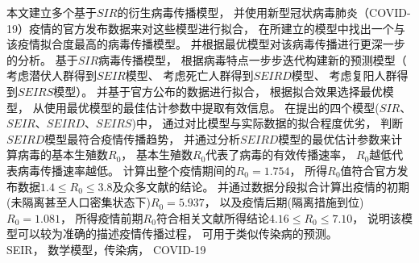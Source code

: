 \begin{cnabstract}
	\songti {}
	本文建立多个基于$SIR$的衍生病毒传播模型，
	并使用新型冠状病毒肺炎（COVID-19）疫情的官方发布数据来对这些模型进行拟合，
	在所建立的模型中找出一个与该疫情拟合度最高的病毒传播模型。
	并根据最优模型对该病毒传播进行更深一步的分析。
	基于$SIR$病毒传播模型，
	根据病毒特点一步步迭代构建新的预测模型（
	考虑潜伏人群得到$SEIR$模型、
	考虑死亡人群得到$SEIRD$模型、
	考虑复阳人群得到$SEIRS$模型）。
	并基于官方公布的数据进行拟合，
	根据拟合效果选择最优模型，
	从使用最优模型的最佳估计参数中提取有效信息。
	在提出的四个模型($SIR$、$SEIR$、$SEIRD$、$SEIRS$)中，
	通过对比模型与实际数据的拟合程度优劣，
	判断$SEIRD$模型最符合疫情传播趋势，
	并通过分析$SEIRD$模型的最优估计参数来计算病毒的基本生殖数$R_0$，
	基本生殖数$R_0$代表了病毒的有效传播速率，
	$R_0$越低代表病毒传播速率越低。
	计算出整个疫情期间的$R_0=1.754$，
	所得$R_0$值符合官方发布数据$1.4\leq R_0\leq 3.8$及众多文献的结论。
	并通过数据分段拟合计算出疫情的初期(未隔离甚至人口密集状态下)$R_0=5.937$，
	以及疫情后期(隔离措施到位)$R_0=1.081$，
	所得疫情前期$R_0$符合相关文献所得结论$4.16\leq R_0\leq 7.10$，
	说明该模型可以较为准确的描述疫情传播过程，
	可用于类似传染病的预测。
	\\
	 SEIR， 数学模型，传染病， COVID-19
\end{cnabstract}
